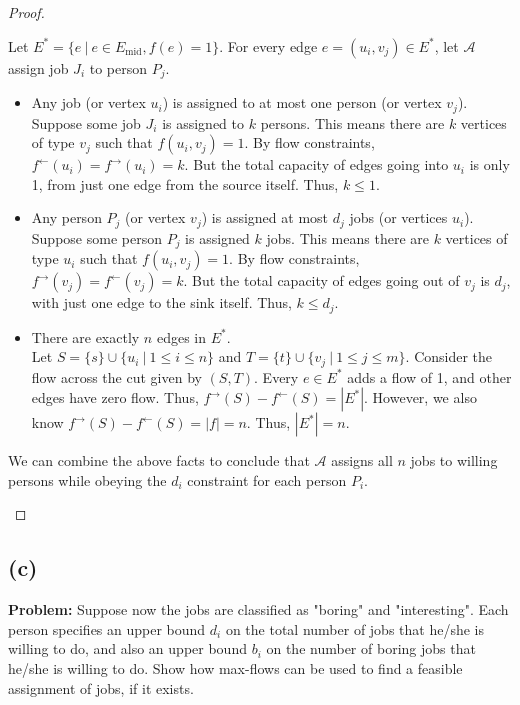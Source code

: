 \documentclass[11pt, fleqn]{article}
\begin{document}
\begin{proof}
\begin{itemize}
    Let $E^* = \{e\ |\ e\in E_{\text{mid}}, f(e)=1\}$. For every edge $e=(u_i,v_j)\in E^*$, let $\mathcal{A}$ assign job $J_i$ to person $P_j$.
    \begin{itemize}
        \item Any job (or vertex $u_i$) is assigned to at most one person (or vertex $v_j$).\\
        Suppose some job $J_i$ is assigned to $k$ persons. This means there are $k$ vertices of type $v_j$ such that $f(u_i,v_j)=1$. By flow constraints, $f^{\leftarrow}(u_i) = f^{\rightarrow}(u_i) = k$. But the total capacity of edges going into $u_i$ is only 1, from just one edge from the source itself. Thus, $k\leq 1$.
        \item Any person $P_j$ (or vertex $v_j$) is assigned at most $d_j$ jobs (or vertices $u_i$).\\
        Suppose some person $P_j$ is assigned $k$ jobs. This means there are $k$ vertices of type $u_i$ such that $f(u_i,v_j)=1$. By flow constraints, $f^{\rightarrow}(v_j) = f^{\leftarrow}(v_j) = k$. But the total capacity of edges going out of $v_j$ is $d_j$, with just one edge to the sink itself. Thus, $k\leq d_j$.
        \item There are exactly $n$ edges in $E^*$.\\
        Let $S = \{s\}\cup\{u_i\ |\ 1\leq i\leq n\}$ and $T = \{t\}\cup\{v_j\ |\ 1\leq j\leq m\}$. Consider the flow across the cut given by $(S,T)$. Every $e\in E^*$ adds a flow of 1, and other edges have zero flow. Thus, $f^{\rightarrow}(S)-f^{\leftarrow}(S) = |E^*|$. However, we also know $f^{\rightarrow}(S)-f^{\leftarrow}(S) = |f| = n$. Thus, $|E^*|=n$.
    \end{itemize}
    We can combine the above facts to conclude that $\mathcal{A}$ assigns all $n$ jobs to willing persons while obeying the $d_i$ constraint for each person $P_i$.
\end{itemize}
\end{proof}

\newpage

\subsection*{(c)}

\textbf{Problem: } Suppose now the jobs are classified as "boring" and "interesting". Each person specifies an upper bound $d_i$ on the total number of jobs that he/she is willing to do, and also an upper bound $b_i$ on the number of boring jobs that he/she is willing to do. Show how max-flows can be used to find a feasible assignment of jobs, if it exists.
\end{document}
